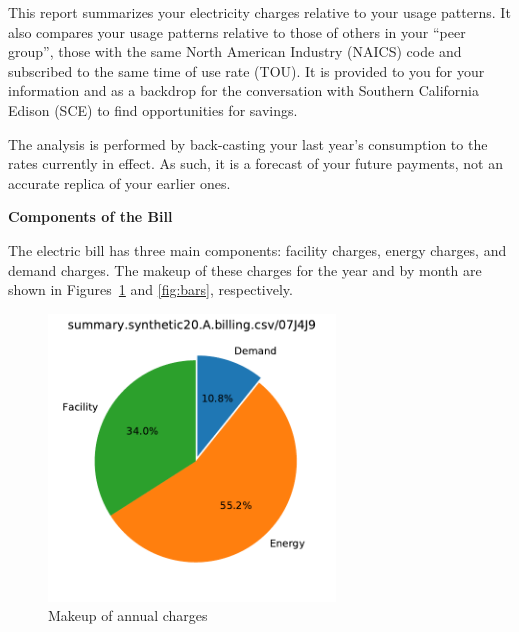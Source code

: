 \documentclass[11pt]{article}
\begin{document}
\pagestyle{title}
This report summarizes your electricity charges relative to your usage patterns. It also compares your usage patterns relative to those of others in your ``peer group'', those with the same North American Industry (NAICS) code and subscribed to the same time of use rate (TOU). It is provided to you for your information and as a backdrop for the conversation with Southern California Edison (SCE) to find opportunities for savings.

The analysis is performed by back-casting your last year's consumption to the rates currently in effect. As such, it is a forecast of your future payments, not an accurate replica of your earlier ones.

\vspace{3ex}
\textbf{\Large Components of the Bill}
\vspace{1ex}

The electric bill has three main components: facility charges, energy charges, and demand charges. The makeup of these charges for the year and by month are shown in Figures~\ref{fig:pie} and \ref{fig:bars}, respectively.
\begin{figure}[!h]
\centering
\includegraphics[height=3in, page=1, trim=0in 0.45in 0in 0.45in, clip]{visuals/synthetic20.A.piecharts.pdf}
\caption{Makeup of annual charges}
\label{fig:pie}
\end{figure}
\end{document}
